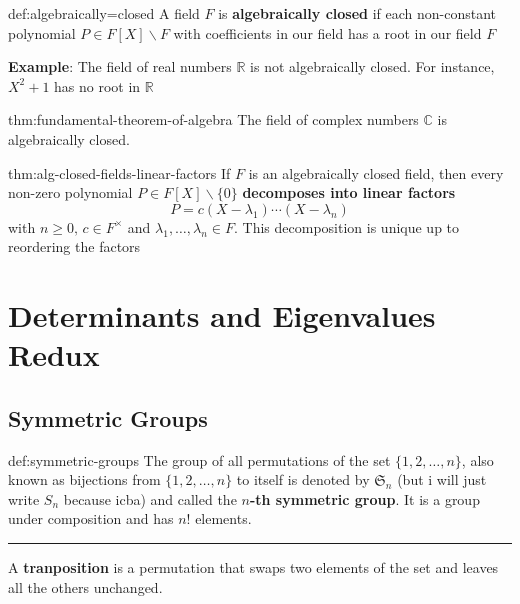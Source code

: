 \documentclass{article}
\begin{document}
\begin{dfn}{def:algebraically=closed}{}
    A field $F$ is \textbf{algebraically closed} if each non-constant polynomial $P\in F[X]\backslash F$ with coefficients in our field has a root in our field $F$
\end{dfn}

\textbf{Example}: The field of real numbers $\mathbb{R}$ is not algebraically closed. For instance, $X^{2} + 1$ has no root in $\mathbb{R}$

\begin{thm}{thm:fundamental-theorem-of-algebra}{}
    The field of complex numbers $\mathbb{C}$ is algebraically closed.
\end{thm}

\begin{thm}{thm:alg-closed-fields-linear-factors}{}
    If $F$ is an algebraically closed field, then every non-zero polynomial $P\in F[X]\backslash \{0\}$ \textbf{decomposes into linear factors}
    \[P = c(X - \lambda_{1}) \cdots (X - \lambda_{n})\]
    with $n\ge 0,\, c\in F^{\times}$ and $\lambda_{1},\dots,\lambda_{n}\in F$. This decomposition is unique up to reordering the factors
\end{thm}



\newpage
\section{Determinants and Eigenvalues Redux}

\subsection{Symmetric Groups}

\begin{dfn}{def:symmetric-groups}{}
    The group of all permutations of the set $\{1,2,\dots,n\}$, also known as bijections from $\{1,2,\dots,n\}$ to itself is denoted by $\mathfrak{S}_{n}$ (but i will just write $S_{n}$ because icba) and called the \textbf{$n$-th symmetric group}. It is a group under composition and has $n!$ elements.

    \noindent\rule{\textwidth}{0.2pt}
    A \textbf{tranposition} is a permutation that swaps two elements of the set and leaves all the others unchanged.
\end{dfn}
\end{document}
